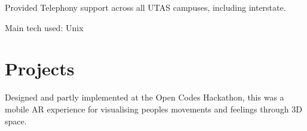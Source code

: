 \documentclass[a4paper]{deedy-resume_twopage} %
\begin{document}
\begin{minipage}[t]{0.66\textwidth}
  \sectionspace %



  \begin{tightitemize}
  \item Provided Telephony support across all UTAS campuses, including interstate.
  \end{tightitemize}
  Main tech used: \textbullet{} Unix

  \sectionspace %



  \section{Projects}


  Designed and partly implemented at the Open Codes Hackathon, this was a mobile AR experience for visualising peoples movements and feelings through 3D space.


\end{minipage}
\end{document}
